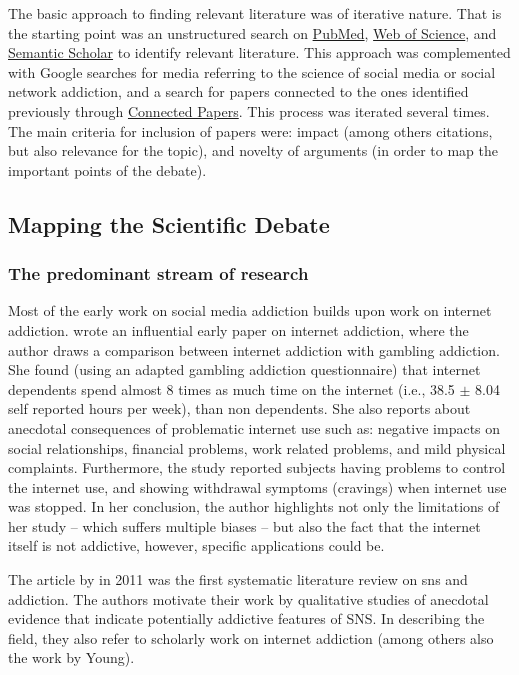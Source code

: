 The basic approach to finding relevant literature was of iterative nature.
That is the starting point was an unstructured search on \href{https://pubmed.ncbi.nlm.nih.gov/about/}{PubMed}, \href{https://www.webofscience.com/}{Web of Science}, and \href{https://www.semanticscholar.org/}{Semantic Scholar} to identify relevant literature. 
This approach was complemented with Google searches for media referring to the science of social media or social network addiction, and a search for papers connected to the ones identified previously through \href{https://www.connectedpapers.com}{Connected Papers}. 
This process was iterated several times. 
The main criteria for inclusion of papers were: impact (among others citations, but also relevance for the topic), and novelty of arguments (in order to map the important points of the debate).

\subsection{Mapping the Scientific Debate}
\label{sec:mapping}
\subsubsection{The predominant stream of research}
Most of the early work on social media addiction builds upon work on internet addiction. 
\citet{young_internet_1998} wrote an influential early paper on internet addiction, where the author draws a comparison between internet addiction with gambling addiction.
She found (using an adapted gambling addiction questionnaire) that internet dependents spend almost 8 times as much time on the internet (i.e., 38.5 $\pm$ 8.04 self reported hours per week), than non dependents. 
She also reports about anecdotal consequences of problematic internet use such as: negative impacts on social relationships, financial problems, work related problems, and mild physical complaints.
Furthermore, the study reported subjects having problems to control the internet use, and showing withdrawal symptoms (cravings) when internet use was stopped. 
In her conclusion, the author highlights not only the limitations of her study -- which suffers multiple biases -- but also the fact that the internet itself is not addictive, however, specific applications could be.

The article by \citet{kuss_online_2011} in 2011 was the first systematic literature review on \gls{sns} and addiction. 
The authors motivate their work by qualitative studies of anecdotal evidence that indicate potentially addictive features of SNS.
In describing the field, they also refer to scholarly work on internet addiction (among others also the work by Young).

